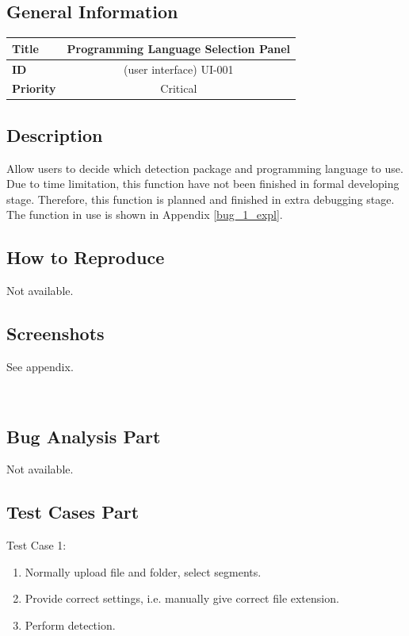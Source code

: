 \documentclass[twoside,a4paper]{refart}
\begin{document}
\subsection*{General Information}
\begin{table}[!h]
\begin{tabular}{|l|c|}
\hline
\textbf{Title} & Programming Language Selection Panel \\ \hline
\textbf{ID} & (user interface) UI-001 \\ \hline
\textbf{Priority} & Critical \\ \hline
\end{tabular}
\end{table}

\subsection*{Description}
Allow users to decide which detection package and programming language to use. Due to time limitation, this function have not been finished in formal developing stage. Therefore, this function is planned and finished in extra debugging stage. The function in use is shown in Appendix \ref{bug_1_expl}.

\subsection*{How to Reproduce}
Not available.

\subsection*{Screenshots}
See appendix.

$\ $

\subsection{Bug Analysis Part}
Not available.

\subsection{Test Cases Part}
Test Case 1:

\begin{enumerate}
\item Normally upload file and folder, select segments.
\item Provide correct settings, i.e. manually give correct file extension.
\item Perform detection.
\end{enumerate}
\end{document}
